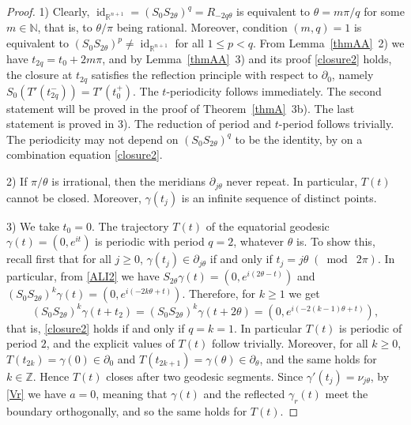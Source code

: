\documentclass[11pt,a4paper,times]{amsart}
\theoremstyle{plain}
\theoremstyle{definition}
\numberwithin{equation}{section}
\DeclareMathOperator\id{id}
\newcommand{\R}{\mathbb{R}}
\newcommand{\N}{\mathbb{N}}
\newcommand{\Z}{\mathbb{Z}}
\newcommand{\modu}[1]{\;(\bmod\;{#1})}
\begin{document}
\begin{proof}%
1) Clearly,   $\id_{\R^{n+1}}=(S_0S_{2\theta})^q=R_{-2q\theta}$ is equivalent to $\theta=m\pi/q$ for some $m\in \N$, that is, to $\theta/\pi$ being rational. Moreover,  condition $(m,q)=1$ is equivalent to $(S_0S_{2\theta})^p\neq \id_{\R^{n+1}}$ for all $1\leq p<q$.
From Lemma~\ref{thmAA}{\rm~2)} we have $t_{2q}=t_0+2m\pi$, and by Lemma~\ref{thmAA}{\rm~3)} and its proof \eqref{closure2} holds, the closure at $t_{2q}$ satisfies the reflection principle with respect to $\partial_0$, namely
$S_0(T'(t^-_{2q}))=T'(t_0^+)$.
The $t$-periodicity follows immediately.
The second  statement will be proved in the proof of Theorem~\ref{thmA}{\rm~3b)}. The last statement is proved in 3). The reduction of period and $t$-period follows trivially.  The periodicity may not depend  on $(S_0S_{2\theta})^q$ to be the identity, by  on a  combination  equation \eqref{closure2}.
\smallskip

2) If $\pi/\theta$ is irrational, then the meridians $\partial_{j\theta}$ never repeat.
In particular, $T(t)$ cannot be closed. Moreover, $\gamma(t_j)$ is an infinite sequence of distinct points.
\smallskip

3) We take $t_0=0$.
The trajectory $T(t)$ of the equatorial geodesic $\gamma(t)=(0,e^{it})$ is periodic with period $q=2$, whatever $\theta$ is.
To show this, recall first that for all $j\geq 0$, $\gamma(t_j)\in \partial_{j\theta}$ if and only if $t_j=j\theta\modu{2\pi}$.
In particular, from \eqref{ALI2} we have
$S_{2\theta}\gamma(t)=(0, e^{i(2\theta-t)})$  and $ (S_0S_{2\theta})^k\gamma(t)=  (0,e^{i(-2k\theta+t)})$.
Therefore, for $k\geq 1$ we get
\[
(S_0S_{2\theta})^k\gamma(t+t_2)=(S_0S_{2\theta})^k\gamma(t+2\theta)=(0,e^{i(-2(k-1)\theta+ t)}),
\]
that is, \eqref{closure2} holds if and only if $q=k=1$. In particular $T(t)$ is periodic of period $2$, and the explicit values of $T(t)$ follow trivially. Moreover,
for all $k\geq 0$, $T(t_{2k})=\gamma(0)\in \partial_0$ and $T(t_{2k+1})=\gamma(\theta)\in \partial_{\theta}$, and the same holds for $k\in \Z$.
Hence $T(t)$ closes after two geodesic segments.
Since $\gamma'(t_j)= \nu_{j\theta}$, by \eqref{Vr} we have $a=0$, meaning that $\gamma(t)$ and the reflected $\gamma_r(t)$ meet the boundary orthogonally, and so the same holds for $T(t)$.
\end{proof}
\end{document}
